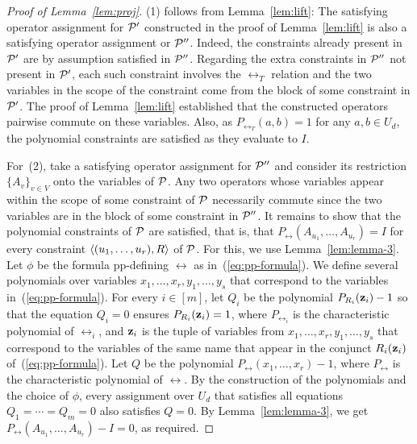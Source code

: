 \begin{proof}[Proof of Lemma~\ref{lem:proj}]
%
(1) follows from Lemma~\ref{lem:lift}: The satisfying operator assignment for ${\mathcal P}'$ constructed in the proof of Lemma~\ref{lem:lift} is also a satisfying operator assignment or ${\mathcal P}''$. Indeed, the constraints already present in ${\mathcal P}'$ are by assumption satisfied in ${\mathcal P}''$. Regarding the extra constraints in ${\mathcal P}''$ not present in ${\mathcal P}'$, each such constraint involves the $\rel_T$ relation and the two variables in the scope of the constraint come from the block of some constraint in ${\mathcal P}'$. The proof of Lemma~\ref{lem:lift} established that the constructed operators pairwise commute on these variables. Also, as $P_{\rel_T}(a,b)=1$ for any $a,b\in U_d$, the polynomial constraints are satisfied as they evaluate to $I$.

For~(2), take a satisfying operator assignment for ${\mathcal P}''$ and consider its restriction $\{A_v\}_{v\in V}$ onto the variables of ${\mathcal P}$. Any two operators whose variables appear within the scope of some constraint of ${\mathcal P}$ necessarily commute since the two variables are in the block of some constraint in ${\mathcal P}''$. It remains to show that the polynomial constraints of ${\mathcal P}$ are satisfied, that is, that $P_\rel(A_{u_1},\ldots,A_{u_r})=I$ for every constraint $\langle (u_1,\ldots,u_r),R \rangle$ of ${\mathcal P}$.
%
For this, we use Lemma~\ref{lem:lemma-3}.
Let $\phi$ be the formula pp-defining $\rel$ as in~(\ref{eq:pp-formula}). We
  define several polynomials over variables $x_1,\ldots,x_r,y_1,\ldots,y_s$ that
  correspond to the variables in~(\ref{eq:pp-formula}). For every $i\in [m]$,
  let $Q_i$ be the polynomial $P_{R_i}({\bf z}_i)-1$ so that the equation $Q_i=0$
  ensures $P_{R_i}({\bf z}_i)=1$, where $P_{\rel_i}$ is the characteristic
  polynomial of $\rel_i$, and ${\bf z}_i$ is the tuple of variables from
  $x_1,\ldots,x_r,y_1,\ldots,y_s$ that correspond to the variables of the same
  name that appear in the conjunct $R_i({\bf z}_i)$ of~(\ref{eq:pp-formula}).
Let $Q$ be the polynomial $P_\rel(x_1,\ldots,x_r)-1$, where $P_\rel$ is the characteristic polynomial of $\rel$. By the construction of the polynomials and the choice of $\phi$, every assignment over $U_d$ that satisfies all equations $Q_1=\cdots=Q_m=0$ also satisfies $Q=0$. By Lemma~\ref{lem:lemma-3}, we get $P_\rel(A_{u_1},\ldots,A_{u_r})-I=0$, as required.
%
\end{proof}


